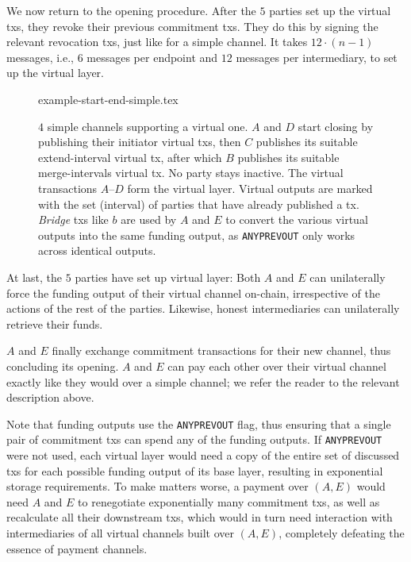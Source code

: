   We now return to the opening procedure. After the $5$ parties set up the virtual txs, they revoke their previous
  commitment
  txs. They do this by signing the relevant revocation txs, just like
  for a simple channel. It takes $12 \cdot (n-1)$ messages, i.e., $6$ messages
  per endpoint and $12$ messages per intermediary, to set up the virtual layer.

  \addtolength{\intextsep}{-15pt}
  \begin{figure*}
    \centering
    {example-start-end-simple.tex}
    \caption{$4$ simple channels supporting a virtual one. $A$ and $D$ start
    closing by publishing their initiator virtual txs, then $C$ publishes its
    suitable extend-interval virtual tx, after which $B$ publishes its suitable
    merge-intervals virtual tx. No party stays inactive. The virtual
    transactions $A$--$D$ form the virtual layer. Virtual outputs are marked
    with the set (interval) of parties that have already published a tx.
    \emph{Bridge} txs like $b$ are used by $A$ and $E$ to convert the various
    virtual outputs into the same funding output, as \texttt{ANYPREVOUT} only
    works across identical outputs.}
    \label{figure:example-start-end-simple}
  \end{figure*}
  \addtolength{\intextsep}{15pt}

  At last, the $5$ parties have set up virtual layer: Both $A$ and $E$ can
  unilaterally
  force the funding output of their virtual channel on-chain, irrespective of
  the actions of the rest of the parties. Likewise, honest intermediaries can
  unilaterally retrieve their funds.

  $A$ and $E$ finally exchange
  commitment transactions for their new channel, thus concluding its opening.
  $A$ and $E$ can pay each other over their virtual channel exactly like
  they would over a simple channel; we refer the reader to the relevant
  description above.

  Note that funding outputs use the \texttt{ANYPREVOUT} flag, thus ensuring
  that a single pair of commitment txs can spend any of the funding outputs. If
  \texttt{ANYPREVOUT} were not used, each virtual layer would need a copy of the
  entire set of discussed txs for each possible funding output of its base
  layer, resulting in exponential storage requirements. To make matters worse,
  a payment over $(A, E)$ would need $A$ and $E$ to renegotiate exponentially
  many commitment txs, as well as recalculate all their downstream txs, which
  would in turn need interaction with intermediaries of all virtual channels
  built over $(A, E)$, completely defeating the essence of payment channels.

